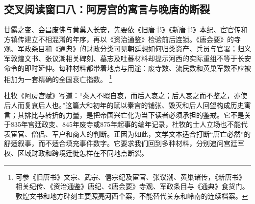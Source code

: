\subsection{交叉阅读窗口八：阿房宫的寓言与晚唐的断裂}

甘露之变、会昌废佛与黄巢入长安，先要依《旧唐书》《新唐书》本纪、宦官传和方镇传建立不相混淆的年序，再以《资治通鉴》检验前后连锁。《唐会要》的寺观、军政条目和《通典》的财政分类可见朝廷想如何归类资产、兵员与官署；归义军敦煌文书、张议潮相关碑刻、墓志及吐蕃材料却提示河西的实际重组不等于长安命令的即时延伸。每种材料都带着地点与用途：废寺数、流民数和黄巢军数不应被相加为一套精确的全国衰亡指数。%
\footnote{可参《旧唐书》文宗、武宗、僖宗纪及宦官、张议潮、黄巢诸传，《新唐书》相关纪传、《资治通鉴》唐纪、《唐会要》寺观、军政条目与《通典》食货门。敦煌文书和地方碑刻主要照亮河西个案，不能替代关东和岭南的连续档案。}

杜牧《阿房宫赋》写道：“秦人不暇自哀，而后人哀之；后人哀之而不鉴之，亦使后人而复哀后人也。”这篇大和初年的赋以秦宫的铺张、毁灭和后人回望构成历史寓言；其排比与转折的力量，是把帝国兴亡化为当下读者必须承担的鉴戒。它不是关于835年宫廷政变、845年废寺或875年起事的编年记录，杜牧的士人立场也不能代表宦官、僧侣、军户和商人的判断。正因为如此，文学文本适合打断“唐亡必然”的舒适叙事，而不适合填充事件数字。它要求我们回到多种材料，分别追问宫廷军权、区域财政和跨境迁徙怎样在不同地点断裂。
